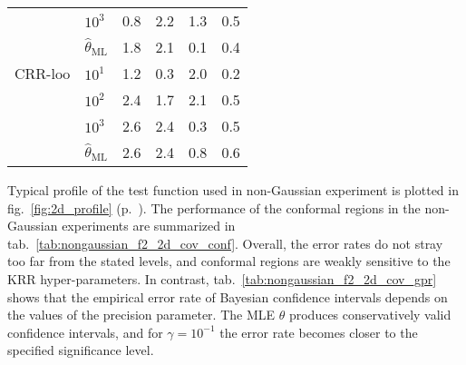 \documentclass[conference]{IEEEtran}
\begin{document}
\begin{table}
\begin{tabular}{ll||rrrr}
       & $10^3$ &      0.8 &      2.2 &      1.3 &      0.5 \\
       & $\hat{\theta}_\text{ML}$ &      1.8 &      2.1 &      0.1 &      0.4 \\
  \midrule
  CRR-loo & $10^1$ &      1.2 &      0.3 &      2.0 &      0.2 \\
       & $10^2$ &      2.4 &      1.7 &      2.1 &      0.5 \\
       & $10^3$ &      2.6 &      2.4 &      0.3 &      0.5 \\
       & $\hat{\theta}_\text{ML}$ &      2.6 &      2.4 &      0.8 &      0.6 \\
  \bottomrule
  \end{tabular}
\end{table}

Typical profile of the test function used in non-Gaussian experiment is plotted
in fig.~\ref{fig:2d_profile} (p.~\pageref{fig:2d_profile}). The performance of the
conformal regions in the non-Gaussian experiments are summarized in tab.~\ref{tab:nongaussian_f2_2d_cov_conf}.
Overall, the error rates do not stray too far from the stated levels, and conformal
regions are weakly sensitive to the KRR hyper-parameters. In contrast, tab.~\ref{tab:nongaussian_f2_2d_cov_gpr}
shows that the empirical error rate of Bayesian confidence intervals depends on the
values of the precision parameter. The MLE $\theta$ produces conservatively valid
confidence intervals, and for $\gamma=10^{-1}$ the error rate becomes closer to
the specified significance level.
\end{document}
